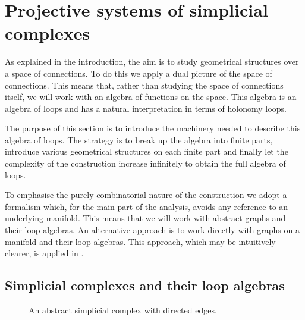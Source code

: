 \documentclass[12pt]{article}
\begin{document}
\section{Projective systems of simplicial complexes}
\label{section1}


As explained in the introduction, the aim is to study geometrical structures over a space of connections. To do this we apply a dual picture of the space of connections. This means that, rather than studying the space of connections itself, we will work with an algebra of functions on the space. This algebra is an algebra of loops and has a natural interpretation in terms of holonomy loops. 


The purpose of this section is to introduce the machinery needed to describe this algebra of loops. The strategy is to break up the algebra into finite parts, introduce various geometrical structures on each finite part and finally let the complexity of the construction increase infinitely to obtain the full algebra of loops. 

To emphasise the purely combinatorial nature of the construction we adopt a formalism which, for the main part of the analysis, avoids any reference to an underlying manifold. This means that we will work with abstract graphs and their loop algebras. An alternative approach is to work directly with graphs on a manifold and their loop algebras. This approach, which may be intuitively clearer, is applied in \cite{Aastrup}.






\subsection{Simplicial complexes and their loop algebras}
\label{sec11}
\begin{figure}[t]
\begin{center}
 
\caption{An abstract simplicial complex with directed edges.}
\end{center}
\end{figure}
\end{document}
